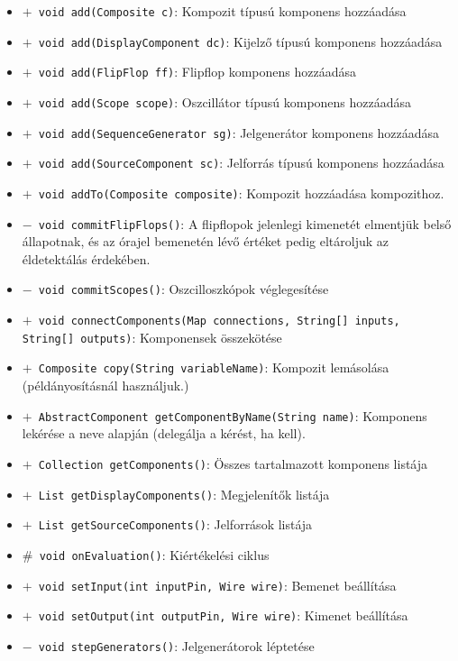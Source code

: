 \begin{itemize}
\begin{itemize}
	\item[] \texttt{$+$ void add(Composite c)}: Kompozit típusú komponens hozzáadása
	\item[] \texttt{$+$ void add(DisplayComponent dc)}: Kijelző típusú komponens hozzáadása
	\item[] \texttt{$+$ void add(FlipFlop ff)}: Flipflop komponens hozzáadása
	\item[] \texttt{$+$ void add(Scope scope)}: Oszcillátor típusú komponens hozzáadása
	\item[] \texttt{$+$ void add(SequenceGenerator sg)}: Jelgenerátor komponens hozzáadása
	\item[] \texttt{$+$ void add(SourceComponent sc)}: Jelforrás típusú komponens hozzáadása
	\item[] \texttt{$+$ void addTo(Composite composite)}: Kompozit hozzáadása kompozithoz.
	\item[] \texttt{$-$ void commitFlipFlops()}: A flipflopok jelenlegi kimenetét elmentjük belső állapotnak, és az órajel  bemenetén lévő értéket pedig eltároljuk az éldetektálás érdekében.
	\item[] \texttt{$-$ void commitScopes()}: Oszcilloszkópok véglegesítése
	\item[] \texttt{$+$ void connectComponents(Map connections, String[] inputs, String[] outputs)}: Komponensek összekötése
	\item[] \texttt{$+$ Composite copy(String variableName)}: Kompozit lemásolása (példányosításnál használjuk.)
	\item[] \texttt{$+$ AbstractComponent getComponentByName(String name)}: Komponens lekérése a neve alapján (delegálja a kérést, ha kell).
	\item[] \texttt{$+$ Collection getComponents()}: Összes tartalmazott komponens listája
	\item[] \texttt{$+$ List getDisplayComponents()}: Megjelenítők listája
	\item[] \texttt{$+$ List getSourceComponents()}: Jelforrások listája
	\item[] \texttt{$\#$ void onEvaluation()}: Kiértékelési ciklus
	\item[] \texttt{$+$ void setInput(int inputPin, Wire wire)}: Bemenet beállítása
	\item[] \texttt{$+$ void setOutput(int outputPin, Wire wire)}: Kimenet beállítása
	\item[] \texttt{$-$ void stepGenerators()}: Jelgenerátorok léptetése
\end{itemize}
\end{itemize}

